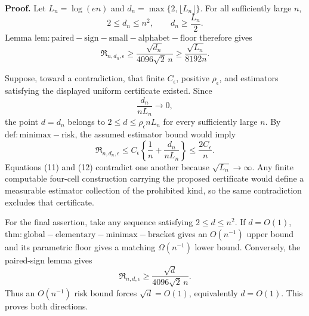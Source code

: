 \textbf{Proof.}
Let \(L_n=\log(en)\) and \(d_n=\max\{2,\lfloor L_n\rfloor\}\).  For all sufficiently large \(n\),
\[
 2\le d_n\le n^2,
 \qquad
 d_n\ge\frac{L_n}{2}.
\]
Lemma \(\mathrm{lem:paired-sign-small-alphabet-floor}\) therefore gives
\[
 \mathfrak R_{n,d_n,\epsilon}
 \ge\frac{\sqrt{d_n}}{4096\sqrt2\,n}
 \ge\frac{\sqrt{L_n}}{8192n}.
\tag{11}
\]

Suppose, toward a contradiction, that finite \(C_\epsilon\), positive \(\rho_\epsilon\), and estimators satisfying the displayed uniform certificate existed.  Since
\[
 \frac{d_n}{nL_n}\longrightarrow0,
\]
the point \(d=d_n\) belongs to \(2\le d\le\rho_\epsilon nL_n\) for every sufficiently large \(n\).  By \(\mathrm{def:minimax-risk}\), the assumed estimator bound would imply
\[
 \mathfrak R_{n,d_n,\epsilon}
 \le C_\epsilon\left\{\frac1n+\frac{d_n}{nL_n}\right\}
 \le\frac{2C_\epsilon}{n}.
\tag{12}
\]
Equations (11) and (12) contradict one another because \(\sqrt{L_n}\to\infty\).  Any finite computable four-cell construction carrying the proposed certificate would define a measurable estimator collection of the prohibited kind, so the same contradiction excludes that certificate.

For the final assertion, take any sequence satisfying \(2\le d\le n^2\).  If \(d=O(1)\), \(\mathrm{thm:global-elementary-minimax-bracket}\) gives an \(O(n^{-1})\) upper bound and its parametric floor gives a matching \(\Omega(n^{-1})\) lower bound.  Conversely, the paired-sign lemma gives
\[
 \mathfrak R_{n,d,\epsilon}
 \ge\frac{\sqrt d}{4096\sqrt2\,n}.
\]
Thus an \(O(n^{-1})\) risk bound forces \(\sqrt d=O(1)\), equivalently \(d=O(1)\).  This proves both directions.